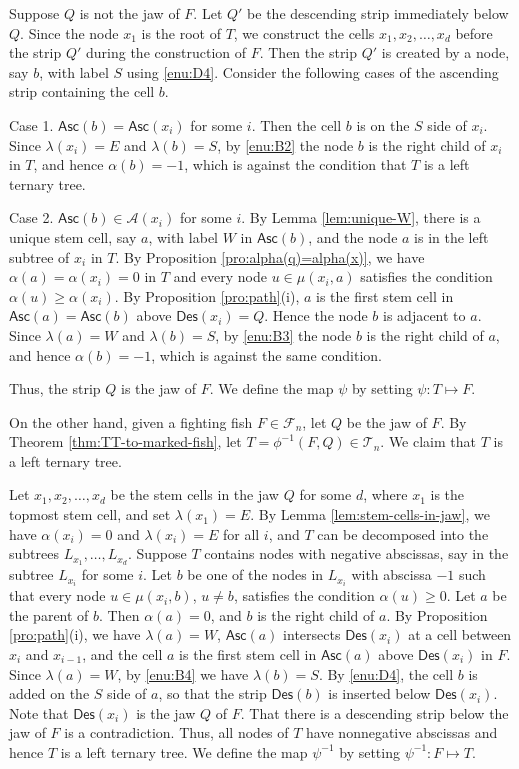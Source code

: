 \documentclass[a4paper,11pt,reqno]{amsart}
\theoremstyle{definition}
\numberwithin{equation}{section}
\newcommand{\A}{{\mathcal{A}}}
\newcommand{\Des}{{\textsf{Des}}}
\newcommand{\Asc}{{\textsf{Asc}}}
\newcommand{\F}{{\mathcal{F}}}
\newcommand{\T}{{\mathcal{T}}}
\begin{document}
Suppose $Q$ is not the jaw of $F$. Let $Q'$ be the descending strip immediately below $Q$. Since the node $x_1$ is the root of $T$, we construct the cells $x_1, x_2,\dots,x_d$ before the strip $Q'$ during the construction of $F$. Then the strip $Q'$ is created by a node, say $b$, with label $S$ using \ref{enu:D4}.  Consider the following cases of the ascending strip containing the cell $b$.

Case 1. $\Asc(b)=\Asc(x_i)$ for some $i$. Then the cell $b$ is on the $S$ side of $x_i$. Since $\lambda(x_i)=E$ and $\lambda(b)=S$, by \ref{enu:B2} the node $b$ is the right child of $x_i$ in $T$, and hence $\alpha(b)=-1$, which is against the condition that $T$ is a left ternary tree.

Case 2. $\Asc(b)\in\A(x_i)$ for some $i$. By Lemma \ref{lem:unique-W}, there is a unique stem cell, say $a$, with label $W$ in $\Asc(b)$, and the node $a$ is in the left subtree of $x_i$ in $T$.  By Proposition \ref{pro:alpha(q)=alpha(x)}, we have $\alpha(a)=\alpha(x_i)=0$ in $T$ and every node $u\in\mu(x_i,a)$ satisfies the condition $\alpha(u)\geq\alpha(x_i)$. By Proposition \ref{pro:path}(i), $a$ is the  first stem cell in $\Asc(a)=\Asc(b)$ above $\Des(x_i)=Q$. Hence the node $b$ is adjacent to $a$. Since $\lambda(a)=W$ and $\lambda(b)=S$, by \ref{enu:B3} the node $b$ is the right child of $a$, and hence $\alpha(b)=-1$, which is against the same condition.

Thus, the strip $Q$ is the jaw of $F$.  We define the map $\psi$ by setting $\psi:T\mapsto F$.


On the other hand, given a fighting fish $F\in\F_n$, let $Q$ be the jaw of $F$. By Theorem \ref{thm:TT-to-marked-fish}, let $T=\phi^{-1}(F,Q)\in\T_n$. We claim that $T$ is a left ternary tree.

Let $x_1,x_2,\dots,x_d$ be the stem cells in the jaw $Q$ for some $d$, where $x_1$ is the topmost stem cell, and set $\lambda(x_1)=E$. 
By Lemma \ref{lem:stem-cells-in-jaw}, we have $\alpha(x_i)=0$ and $\lambda(x_i)=E$ for all $i$, and $T$ can be decomposed into the subtrees $L_{x_1},\dots,L_{x_d}$. Suppose $T$ contains nodes with negative abscissas, say in the subtree $L_{x_i}$ for some $i$. Let $b$ be one of the nodes in $L_{x_i}$ with abscissa $-1$ such that every node $u\in\mu(x_i,b)$, $u\neq b$, satisfies the condition $\alpha(u)\ge 0$. Let $a$ be the parent of $b$. Then $\alpha(a)=0$, and $b$ is the right child of $a$.  By Proposition \ref{pro:path}(i), we have $\lambda(a)=W$,  $\Asc(a)$ intersects $\Des(x_i)$ at a cell between $x_i$ and $x_{i-1}$, and the cell $a$ is the first stem cell in $\Asc(a)$ above $\Des(x_i)$ in $F$. Since $\lambda(a)=W$, by \ref{enu:B4} we have $\lambda(b)=S$. By \ref{enu:D4}, the cell $b$ is added on the $S$ side of $a$, so that the strip $\Des(b)$ is inserted below $\Des(x_i)$. Note that $\Des(x_i)$ is the jaw $Q$ of $F$.  That there is a descending strip below the jaw of $F$ is a contradiction. Thus, all nodes of $T$ have nonnegative abscissas and hence $T$ is a left ternary tree. We define the map $\psi^{-1}$ by setting $\psi^{-1}:F\mapsto T$.
\end{document}
